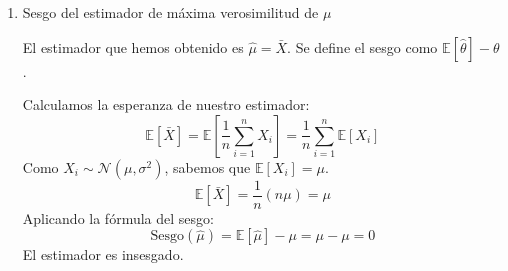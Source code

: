 \begin{enumerate}[label=\color{red}\textbf{\arabic*)}]
\begin{enumerate}[label=\arabic*)]
		            La función de densidad de una variable $\mathcal{N}(\mu,\sigma^2)$ es: \[
			            f(x;\mu,\sigma^2)=\dfrac{1}{\sqrt{2\pi\sigma^2} }e^{-\frac{(x-\mu)^2}{2\sigma^2} }
		            \]
		            La función de verosimilitud para una muestra $x_1,\dots,x_n$ se define como el producto de las densidades: \[
			            L_n(\mu,\sigma^2)=\prod_{i=1}^{n} \dfrac{1}{\sqrt{2\pi\sigma^2} }e^{-\frac{(x-\mu)^2}{2\sigma^2} } =(2\pi\sigma^2)^{-n /2}e^{-\frac{1}{2\sigma^2} \sum_{i=1}^{n} (x_i-\mu)^2}
		            \]
		            Para maximizar, aplicamos el logaritmo neperiano (log-verosimilitud) como se demostró en ejercicios anteriores: \[
			            \ln L_n(\mu,\sigma^2)=-\dfrac{n}{2}\ln(2\pi)-\dfrac{n}{2}\ln(\sigma^2)-\dfrac{1}{2\sigma^2}\sum_{i=1}^{n} (x_i-\mu)^2
		            \]
		            Para encontrar el máximo bidimensional, calculamos las derivadas parciales respecto a $\mu$ y $\sigma^2$ y las igualamos a 0.

		            \textbf{Derivada respecto a $\mu$:} \[
			            \begin{array}{c}
				            \frac{\partial }{\partial \mu} \ln L_n(\mu,\sigma^2)=-\dfrac{1}{2\sigma^2}\sum_{i=1}^{n} 2(x_i-\mu)(-1)=\dfrac{1}{\sigma^2}\sum_{i=1}^{n} (x_i-\mu)=0 \\
				            \sum_{i=1}^{n} x_i-n\mu=0 \implies \hat{\mu}=\dfrac{1}{n}\sum_{i=1}^{n} x_i=\bar{X}
			            \end{array}
		            \]
		            \textbf{Derivada respecto a $\sigma^2$ (tratando $\sigma^2$ como una única variable):} \[
			            \frac{\partial }{\partial (\sigma^2)} \ln L_n(\mu,\sigma^2)=-\dfrac{n}{2\sigma^2}+\dfrac{1}{2(\sigma^2)^2}\sum_{i=1}^{n} (x_i-\mu)^2=0
		            \]
		            Multiplicamos por $2(\sigma^2)^2$: \[
			            -n\sigma^2+\sum_{i=1}^{n} (x_i-\mu)^2=0\implies \hat{\sigma}^2=\dfrac{1}{n}\sum_{i=1}^{n} (x_i-\hat{\mu})^2
		            \]
		            Sustituyendo el estimador de la media encontrado previamente, obtenemos los estimadores de máxima verosimilitud conjuntos: \[
			            (\hat{\mu}_{EMV}, \hat{\sigma}_{EMV}^2)=\left( \bar{X},\dfrac{1}{n}\sum_{i=1}^{n} (X_i-\bar{X})^2 \right)
		            \]
		      \item Sesgo del estimador de máxima verosimilitud de $\mu$

		            El estimador que hemos obtenido es $\hat{\mu}=\bar{X}$. Se define el sesgo como $\mathbb{E}[\hat{\theta}]-\theta$.

		            Calculamos la esperanza de nuestro estimador: \[
			            \mathbb{E}[\bar{X}]=\mathbb{E}\left[ \dfrac{1}{n}\sum_{i=1}^{n} X_i \right] =\dfrac{1}{n}\sum_{i=1}^{n} \mathbb{E}[X_i]
		            \]
		            Como $X_i\sim \mathcal{N}(\mu,\sigma^2)$, sabemos que $\mathbb{E}[X_i]=\mu$. \[
			            \mathbb{E}[\bar{X}]=\dfrac{1}{n}(n \mu)=\mu
		            \]
		            Aplicando la fórmula del sesgo: \[
			            \mathrm{Sesgo}(\hat{\mu})=\mathbb{E}[\hat{\mu}]-\mu=\mu-\mu=0
		            \]
		            El estimador es insesgado.


\end{enumerate}
\end{enumerate}
